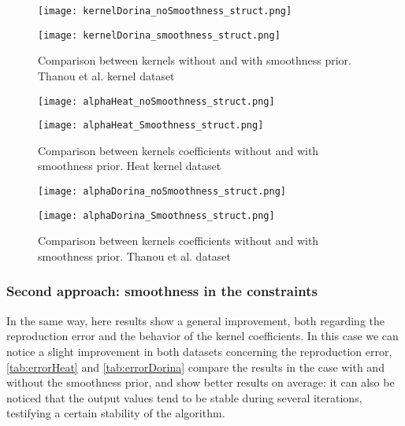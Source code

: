 \begin{figure}
  \begin{minipage}[c]{.5\textwidth}
    \centering
    \texttt{[image: kernelDorina\_noSmoothness\_struct.png]}
  \end{minipage}
  \begin{minipage}[c]{.5\textwidth}
    \centering
    \texttt{[image: kernelDorina\_smoothness\_struct.png]}
  \end{minipage}
  \caption{Comparison between kernels without and with smoothness prior. Thanou et al. kernel dataset}
  \label{fig:kernelDorina_struct}
\end{figure}

\begin{figure}[htbp]
  \centering
  \begin{minipage}[c]{.85\textwidth}
    \centering
    \texttt{[image: alphaHeat\_noSmoothness\_struct.png]}
  \end{minipage}
  \vspace{10mm}
  \begin{minipage}[c]{.85\textwidth}
    \centering
    \texttt{[image: alphaHeat\_Smoothness\_struct.png]}
  \end{minipage}
  \caption{Comparison between kernels coefficients without and with smoothness prior. Heat kernel   dataset}
  \label{fig:alphaHeat_struct}
\end{figure}

\begin{figure}[htbp]
  \centering
  \begin{minipage}[c]{.85\textwidth}
    \centering
    \texttt{[image: alphaDorina\_noSmoothness\_struct.png]}
  \end{minipage}
  \vspace{10mm}
  \begin{minipage}[c]{.85\textwidth}
    \centering
    \texttt{[image: alphaDorina\_Smoothness\_struct.png]}
  \end{minipage}
  \caption{Comparison between kernels coefficients without and with smoothness prior. Thanou et al.   dataset}
  \label{fig:alphaDorina_struct}
\end{figure}

\subsubsection{Second approach: smoothness in the constraints}
In the same way, here results show a general improvement, both regarding the reproduction error and the behavior of the kernel coefficients. In this case we can notice a slight improvement in both datasets concerning the reproduction error, \autoref{tab:errorHeat} and \autoref{tab:errorDorina} compare the results in the case with and without the smoothness prior, and show better results on average: it can also be noticed that the output values tend to be stable during several iterations, testifying a certain stability of the algorithm.

